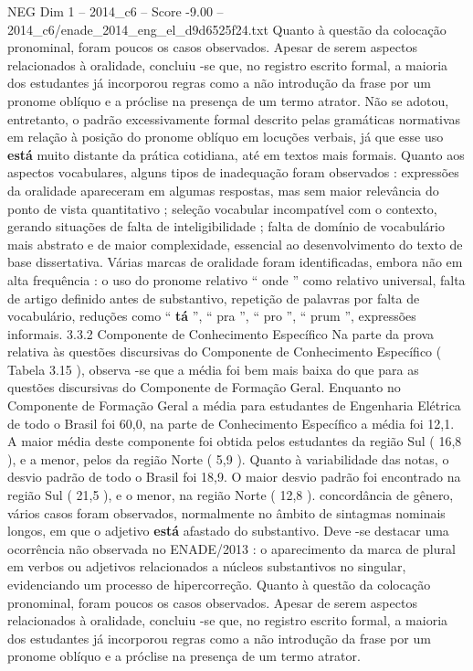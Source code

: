 \begin{textsample}{NEG Dim 1 – 2014\_c6 – Score -9.00 – 2014\_c6/enade\_2014\_eng\_el\_d9d6525f24.txt}
Quanto à questão da colocação pronominal, foram poucos os casos observados.
Apesar de serem aspectos relacionados à oralidade, concluiu -se que, no registro escrito formal, a maioria dos estudantes já incorporou regras como a não introdução da frase por um pronome oblíquo e a próclise na presença de um termo atrator.
Não se adotou, entretanto, o padrão excessivamente formal descrito pelas gramáticas normativas em relação à posição do pronome oblíquo em locuções verbais, já que esse uso \textbf{está} muito distante da prática cotidiana, até em textos mais formais.
Quanto aos aspectos vocabulares, alguns tipos de inadequação foram observados : expressões da oralidade apareceram em algumas respostas, mas sem maior relevância do ponto de vista quantitativo ; seleção vocabular incompatível com o contexto, gerando situações de falta de inteligibilidade ; falta de domínio de vocabulário mais abstrato e de maior complexidade, essencial ao desenvolvimento do texto de base dissertativa.
Várias marcas de oralidade foram identificadas, embora não em alta frequência : o uso do pronome relativo “ onde ” como relativo universal, falta de artigo definido antes de substantivo, repetição de palavras por falta de vocabulário, reduções como “ \textbf{tá} ”, “ pra ”, “ pro ”, “ prum ”, expressões informais. 3.3.2 Componente de Conhecimento Específico Na parte da prova relativa às questões discursivas do Componente de Conhecimento Específico ( Tabela 3.15 ), observa -se que a média foi bem mais baixa do que para as questões discursivas do Componente de Formação Geral.
Enquanto no Componente de Formação Geral a média para estudantes de Engenharia Elétrica de todo o Brasil foi 60,0, na parte de Conhecimento Específico a média foi 12,1.
A maior média deste componente foi obtida pelos estudantes da região Sul ( 16,8 ), e a menor, pelos da região Norte ( 5,9 ).
Quanto à variabilidade das notas, o desvio padrão de todo o Brasil foi 18,9.
O maior desvio padrão foi encontrado na região Sul ( 21,5 ), e o menor, na região Norte ( 12,8 ). concordância de gênero, vários casos foram observados, normalmente no âmbito de sintagmas nominais longos, em que o adjetivo \textbf{está} afastado do substantivo.
Deve -se destacar uma ocorrência não observada no ENADE/2013 : o aparecimento da marca de plural em verbos ou adjetivos relacionados a núcleos substantivos no singular, evidenciando um processo de hipercorreção.
Quanto à questão da colocação pronominal, foram poucos os casos observados.
Apesar de serem aspectos relacionados à oralidade, concluiu -se que, no registro escrito formal, a maioria dos estudantes já incorporou regras como a não introdução da frase por um pronome oblíquo e a próclise na presença de um termo atrator.

\end{textsample}
